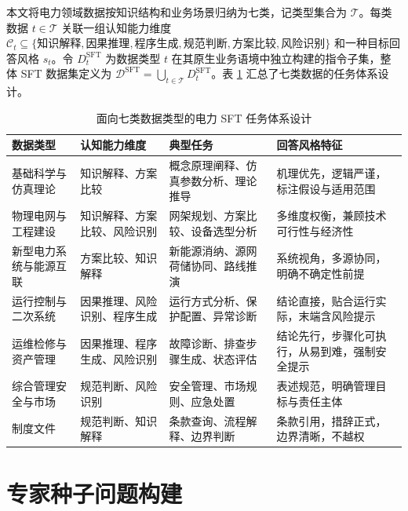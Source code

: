 \documentclass[fontset=fandol,type=master,campus=shenzhen,etitleauto=true]{hithesisbook}
\begin{document}
本文将电力领域数据按知识结构和业务场景归纳为七类，记类型集合为 $\mathcal{T}$。每类数据 $t \in \mathcal{T}$ 关联一组认知能力维度 $\mathcal{C}_t \subseteq \{\text{知识解释}, \text{因果推理}, \text{程序生成}, \text{规范判断}, \text{方案比较}, \text{风险识别}\}$ 和一种目标回答风格 $s_t$。令 $D_t^{\text{SFT}}$ 为数据类型 $t$ 在其原生业务语境中独立构建的指令子集，整体 SFT 数据集定义为 $\mathcal{D}^{\text{SFT}} = \bigcup_{t \in \mathcal{T}} D_t^{\text{SFT}}$。表 \ref{tab:sft-task-design} 汇总了七类数据的任务体系设计。

\begin{table}[htbp]
\centering
\caption{面向七类数据类型的电力 SFT 任务体系设计}
\label{tab:sft-task-design}
\small
\renewcommand{\arraystretch}{1.05}
\begin{tabular}{p{2.2cm}p{2.2cm}p{3.2cm}p{3.6cm}}
\toprule
\textbf{数据类型} & \textbf{认知能力维度} & \textbf{典型任务} & \textbf{回答风格特征} \\
\midrule
基础科学与仿真理论 & 知识解释、方案比较 & 概念原理阐释、仿真参数分析、理论推导 & 机理优先，逻辑严谨，标注假设与适用范围 \\
\midrule
物理电网与工程建设 & 知识解释、方案比较、风险识别 & 网架规划、方案比较、设备选型分析 & 多维度权衡，兼顾技术可行性与经济性 \\
\midrule
新型电力系统与能源互联 & 方案比较、知识解释 & 新能源消纳、源网荷储协同、路线推演 & 系统视角，多源协同，明确不确定性前提 \\
\midrule
运行控制与二次系统 & 因果推理、风险识别、程序生成 & 运行方式分析、保护配置、异常诊断 & 结论直接，贴合运行实际，末端含风险提示 \\
\midrule
运维检修与资产管理 & 因果推理、程序生成、风险识别 & 故障诊断、排查步骤生成、状态评估 & 结论先行，步骤化可执行，从易到难，强制安全提示 \\
\midrule
综合管理安全与市场 & 规范判断、风险识别 & 安全管理、市场规则、应急处置 & 表述规范，明确管理目标与责任主体 \\
\midrule
制度文件 & 规范判断、知识解释 & 条款查询、流程解释、边界判断 & 条款引用，措辞正式，边界清晰，不越权 \\
\bottomrule
\end{tabular}
\end{table}

\section{专家种子问题构建}\label{ux4e13ux5bb6ux79cdux5b50ux95eeux9898ux6784ux5efa}
\end{document}
